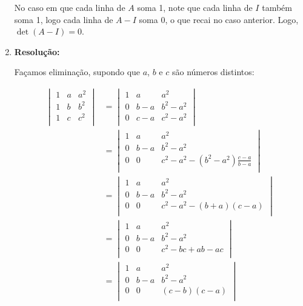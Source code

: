 \documentclass[leqno]{article}
\begin{document}
\begin{enumerate}
    No caso em que cada linha de $A$ soma 1, note que cada linha de $I$ também soma 1, logo cada linha de $A-I$ soma 0, o que recai no caso anterior. Logo, $\det (A-I)=0$.
    
    \item 
    
    \textbf{Resolução:}
    
    Façamos eliminação, supondo que $a$, $b$ e $c$ são números distintos:
    
    \begin{align*}
        \begin{vmatrix}
            1 & a & a^2\\
            1 & b & b^2\\
            1 & c & c^2\\
        \end{vmatrix}&=\begin{vmatrix}
            1 & a & a^2\\
            0 & b-a & b^2-a^2\\
            0 & c-a & c^2-a^2\\
        \end{vmatrix}\\
        &=\begin{vmatrix}
            1 & a & a^2\\
            0 & b-a & b^2-a^2\\
            0 & 0 & c^2-a^2-(b^2-a^2)\frac{c-a}{b-a}\\
        \end{vmatrix}\\
        &=\begin{vmatrix}
            1 & a & a^2\\
            0 & b-a & b^2-a^2\\
            0 & 0 & c^2-a^2-(b+a)(c-a)\\
        \end{vmatrix}\\
        &=\begin{vmatrix}
            1 & a & a^2\\
            0 & b-a & b^2-a^2\\
            0 & 0 & c^2-bc+ab-ac\\
        \end{vmatrix}\\
        &=\begin{vmatrix}
            1 & a & a^2\\
            0 & b-a & b^2-a^2\\
            0 & 0 & (c-b)(c-a)\\
        \end{vmatrix}
    \end{align*}
    

\end{enumerate}
\end{document}

